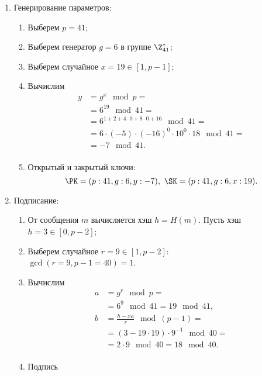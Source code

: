 \begin{enumerate}
    \item Генерирование параметров:
        \begin{enumerate}
            \item Выберем $p=41$;
            \item Выберем генератор $g=6$ в группе $\Z_{41}^*$;
            \item Выберем случайное $x = 19 \in [1, p-1]$;%
            \item Вычислим
                \[ \begin{array}{ll}
                    y & = g^x \mod p = \\
                    & = 6^{19} \mod 41 = \\
                    & = 6^{1 + 2 + 4 \cdot 0 + 8 \cdot 0 + 16} \mod 41 = \\
                    & = 6 \cdot (-5) \cdot (-16)^0 \cdot 10^0 \cdot 18 \mod 41 = \\
                    & = -7 \mod 41. \\
                \end{array} \]
            \item Открытый и закрытый ключи:
                \[ \PK = (p:41, g:6, y:-7), ~ \SK = (p:41, g:6, x:19). \]
        \end{enumerate}
    \item Подписание:
        \begin{enumerate}
            \item От сообщения $m$ вычисляется хэш $h = H(m)$. Пусть хэш $h  = 3 \in [0, p-2]$;
            \item Выберем случайное $r = 9 \in [1, p-2]$: \\
                $\gcd(r=9, p-1 = 40) = 1$.
            \item Вычислим
                \[ \begin{array}{ll}
                    a & = g^r \mod p = \\
                      & = 6^9 \mod 41 = 19 \mod 41, \\
                    b & = \frac{h - xa}{r} \mod (p-1) = \\
                      & = (3 - 19 \cdot 19) \cdot 9^{-1} \mod 40 = \\
                      & = 2 \cdot 9 \mod 40 = 18 \mod 40. \\
                \end{array} \]
            \item Подпись

\end{enumerate}
\end{enumerate}
